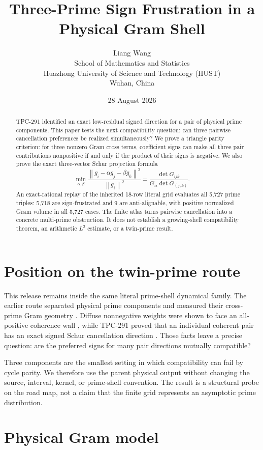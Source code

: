 \documentclass[10pt]{article}
\title{Three-Prime Sign Frustration in a Physical Gram Shell}
\author{Liang Wang\\
School of Mathematics and Statistics\\
Huazhong University of Science and Technology (HUST)\\
Wuhan, China}
\date{28 August 2026}
\newcommand{\norm}[1]{\left\lVert #1\right\rVert}
\begin{document}
\maketitle

\begin{abstract}
TPC-291 identified an exact low-residual signed direction for a pair of
physical prime components.  This paper tests the next compatibility question:
can three pairwise cancellation preferences be realized simultaneously?  We
prove a triangle parity criterion: for three nonzero Gram cross terms,
coefficient signs can make all three pair contributions nonpositive if and
only if the product of their signs is negative.  We also prove the exact
three-vector Schur projection formula
\[
 \min_{\alpha,\beta}\frac{\norm{g_i-\alpha g_j-\beta g_k}^2}{\norm{g_i}^2}
 =\frac{\det G_{ijk}}{G_{ii}\det G_{(j,k)}}.
\]
An exact-rational replay of the inherited 18-row literal grid evaluates all
5,727 prime triples: 5,718 are sign-frustrated and 9 are anti-alignable,
with positive normalized Gram volume in all 5,727 cases.  The finite atlas
turns pairwise cancellation into a concrete multi-prime obstruction.  It
does not establish a growing-shell compatibility theorem, an arithmetic
$L^2$ estimate, or a twin-prime result.
\end{abstract}

\section{Position on the twin-prime route}

This release remains inside the same literal prime-shell dynamical family.
The earlier route separated physical prime components and measured their
cross-prime Gram geometry \cite{tpc287,tpc288,tpc289}.  Diffuse nonnegative
weights were shown to face an all-positive coherence wall \cite{tpc290},
while TPC-291 proved that an individual coherent pair has an exact signed
Schur cancellation direction \cite{tpc291}.  Those facts leave a precise
question: are the preferred signs for many pair directions mutually
compatible?

Three components are the smallest setting in which compatibility can fail by
cycle parity.  We therefore use the parent physical output without changing
the source, interval, kernel, or prime-shell convention.  The result is a
structural probe on the road map, not a claim that the finite grid represents
an asymptotic prime distribution.

\section{Physical Gram model}
\end{document}
